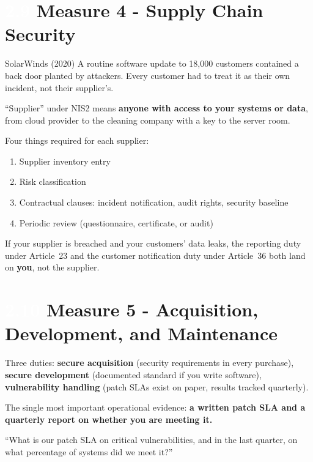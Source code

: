 \documentclass[11pt,a4paper,twoside]{book}
\newcommand{\lessontag}[1]{%
  \texorpdfstring{%
    \setlength{\fboxsep}{3pt}\colorbox{nisd2blue}{\textcolor{white}{\footnotesize\bfseries #1}}\quad%
  }{Lesson #1\ }%
}
\begin{document}
\section{\lessontag{2.9}Measure 4 - Supply Chain Security}

\begin{casestudy}{SolarWinds (2020)}
A routine software update to 18,000 customers contained a back door planted by attackers. Every customer had to treat it as their own incident, not their supplier's.
\end{casestudy}

``Supplier'' under NIS2 means \textbf{anyone with access to your systems or data}, from cloud provider to the cleaning company with a key to the server room.

Four things required for each supplier:
\begin{enumerate}
  \item Supplier inventory entry
  \item Risk classification
  \item Contractual clauses: incident notification, audit rights, security baseline
  \item Periodic review (questionnaire, certificate, or audit)
\end{enumerate}

If your supplier is breached and your customers' data leaks, the reporting duty under Article~23 and the customer notification duty under Article~36 both land on \textbf{you}, not the supplier.

\section{\lessontag{2.10}Measure 5 - Acquisition, Development, and Maintenance}

Three duties: \textbf{secure acquisition} (security requirements in every purchase), \textbf{secure development} (documented standard if you write software), \textbf{vulnerability handling} (patch SLAs exist on paper, results tracked quarterly).

The single most important operational evidence: \textbf{a written patch SLA and a quarterly report on whether you are meeting it.}

\begin{actionbox}
``What is our patch SLA on critical vulnerabilities, and in the last quarter, on what percentage of systems did we meet it?''
\end{actionbox}
\end{document}
